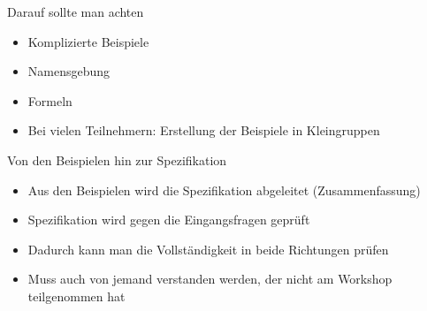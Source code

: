 \begin{frame}{Darauf sollte man achten}

\begin{itemize}
   \item Komplizierte Beispiele
   
   \item Namensgebung
   
   \item Formeln
   
   \item Bei vielen Teilnehmern: Erstellung der Beispiele in Kleingruppen
\end{itemize}


\end{frame}



\begin{frame}{Von den Beispielen hin zur Spezifikation}

\begin{itemize}
	\item Aus den Beispielen wird die Spezifikation abgeleitet (Zusammenfassung)
        \item Spezifikation wird gegen die Eingangsfragen geprüft
	\item Dadurch kann man die Vollständigkeit in beide Richtungen prüfen
	\item Muss auch von jemand verstanden werden, der nicht am Workshop teilgenommen hat
\end{itemize}

\end{frame}
 
